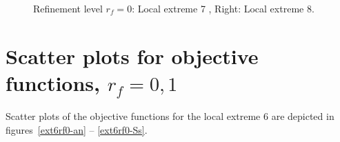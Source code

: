 \documentclass[review]{elsarticle}
\begin{document}
\begin{figure}[htb!]
\label{rf0ex4}
\caption{Refinement level $r_f=0$: Local extreme 7 , Right: Local extreme 8.}
\end{figure}


\section{Scatter plots for objective functions, $r_f=0,1$}
 
 Scatter plots of the objective functions for the local extreme 6 are depicted in figures~\ref{ext6rf0-an} -- \ref{ext6rf0-Ss}.
 
\end{document}
